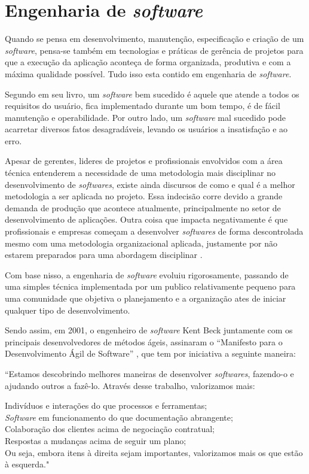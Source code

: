 \section{\textbf{{Engenharia de \textit{software}}}}
\label{engenharia-software}

Quando se pensa em desenvolvimento, manutenção, especificação e criação de um \textit{software}, pensa-se também em tecnologias e práticas de gerência de projetos para que a execução da aplicação aconteça de forma organizada, produtiva e com a máxima qualidade possível. Tudo isso esta contido em engenharia de \textit{software}.

Segundo  em seu livro, um \textit{software} bem sucedido é aquele que atende a todos os requisitos do usuário, fica implementado durante um bom tempo, é de fácil manutenção e operabilidade. Por outro lado, um \textit{software} mal sucedido pode acarretar diversos fatos desagradáveis, levando os usuários a insatisfação e ao erro. 

Apesar de gerentes, lideres de projetos e profissionais envolvidos com a área técnica entenderem a necessidade de uma metodologia mais disciplinar no desenvolvimento de \textit{softwares}, existe ainda discursos de como e qual é a melhor metodologia a ser aplicada no projeto. Essa indecisão corre devido a grande demanda de produção que acontece atualmente, principalmente no setor de desenvolvimento de aplicações. Outra coisa que impacta negativamente é que profissionais e empresas começam a desenvolver \textit{softwares} de forma descontrolada mesmo com uma metodologia organizacional aplicada, justamente por não estarem preparados para uma abordagem disciplinar \cite{PRESSMAN2016}. 

Com base nisso, a engenharia de \textit{software} evoluiu rigorosamente, passando de uma simples técnica implementada por um publico relativamente pequeno para uma comunidade que objetiva o planejamento e a organização ates de iniciar qualquer tipo de desenvolvimento.

Sendo assim, em 2001, o engenheiro de \textit{software} Kent Beck juntamente com os principais
desenvolvedores de métodos ágeis, assinaram o “Manifesto para o Desenvolvimento Ágil de Software” \cite{SOMMERVILLE2011}, que tem por iniciativa a seguinte maneira:

\begin{citacao}
“Estamos descobrindo melhores maneiras de desenvolver \textit{softwares}, fazendo-o e ajudando outros a fazê-lo. Através desse trabalho, valorizamos mais:

Indivíduos e interações do que processos e ferramentas;\\
\textit{Software} em funcionamento do que documentação abrangente;\\
Colaboração dos clientes acima de negociação contratual;\\
Respostas a mudanças acima de seguir um plano;\\
Ou seja, embora itens à direita sejam importantes, valorizamos mais os que estão à esquerda.\cite{SOMMERVILLE2011}"

\end{citacao}

